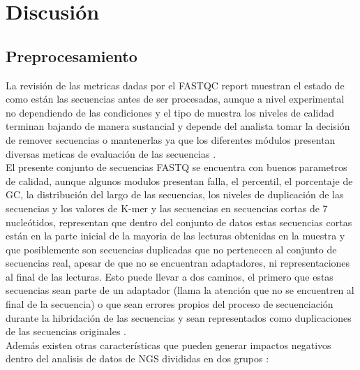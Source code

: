 \section{Discusión}

\subsection*{Preprocesamiento}

La revisión de las metricas dadas por el FASTQC report muestran el estado de como están las secuencias antes de ser procesadas, aunque a nivel experimental no dependiendo de las condiciones y el tipo de muestra los niveles de calidad terminan bajando de manera sustancial y depende del analista tomar la decisión de remover secuencias o mantenerlas ya que los diferentes módulos presentan diversas meticas de evaluación de las secuencias \cite{Babraham2016}. \\

El presente conjunto de secuencias FASTQ se encuentra con buenos parametros de calidad, aunque algunos modulos presentan falla, el percentil, el porcentaje de GC, la distribución del largo de las secuencias, los niveles de duplicación de las secuencias y los valores de K-mer y las secuencias en secuencias cortas de 7 nucleótidos, representan que dentro del conjunto de datos estas secuencias cortas están en la parte inicial de la mayoria de las lecturas obtenidas en la muestra y que posiblemente son secuencias duplicadas que no pertenecen al conjunto de secuencias real, apesar de que no se encuentran adaptadores, ni representaciones al final de las lecturas. Esto puede llevar a dos caminos, el primero que estas secuencias sean parte de un adaptador (llama la atención que no se encuentren al final de la secuencia)  o que sean errores propios del proceso de secuenciación durante la hibridación de las secuencias y sean representados como duplicaciones de las secuencias originales \cite{Babraham2016}\cite{Pirooznia2014}. \\ 

Además existen otras características que pueden generar impactos negativos dentro del analisis de datos de NGS divididas en dos grupos \cite{Zhou2013}: 

